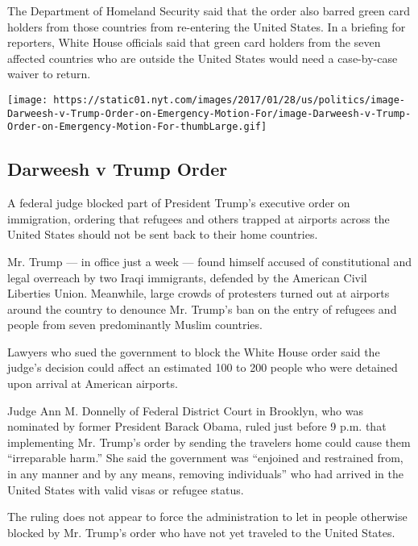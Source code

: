 The Department of Homeland Security said that the order also barred
green card holders from those countries from re-entering the United
States. In a briefing for reporters, White House officials said that
green card holders from the seven affected countries who are outside the
United States would need a case-by-case waiver to return.

\href{https://www.nytimes.com/interactive/2017/01/28/us/politics/trump-darweesh-decision-stay-refugee-ban.html}{}

\texttt{[image: https://static01.nyt.com/images/2017/01/28/us/politics/image-Darweesh-v-Trump-Order-on-Emergency-Motion-For/image-Darweesh-v-Trump-Order-on-Emergency-Motion-For-thumbLarge.gif]}

\hypertarget{darweesh-v-trump-order}{%
\subsection{Darweesh v Trump Order}\label{darweesh-v-trump-order}}

A federal judge blocked part of President Trump's executive order on
immigration, ordering that refugees and others trapped at airports
across the United States should not be sent back to their home
countries.

Mr. Trump --- in office just a week --- found himself accused of
constitutional and legal overreach by two Iraqi immigrants, defended by
the American Civil Liberties Union. Meanwhile, large crowds of
protesters turned out at airports around the country to denounce Mr.
Trump's ban on the entry of refugees and people from seven predominantly
Muslim countries.

Lawyers who sued the government to block the White House order said the
judge's decision could affect an estimated 100 to 200 people who were
detained upon arrival at American airports.

Judge Ann M. Donnelly of Federal District Court in Brooklyn, who was
nominated by former President Barack Obama, ruled just before 9 p.m.
that implementing Mr. Trump's order by sending the travelers home could
cause them ``irreparable harm.'' She said the government was ``enjoined
and restrained from, in any manner and by any means, removing
individuals'' who had arrived in the United States with valid visas or
refugee status.

The ruling does not appear to force the administration to let in people
otherwise blocked by Mr. Trump's order who have not yet traveled to the
United States.

